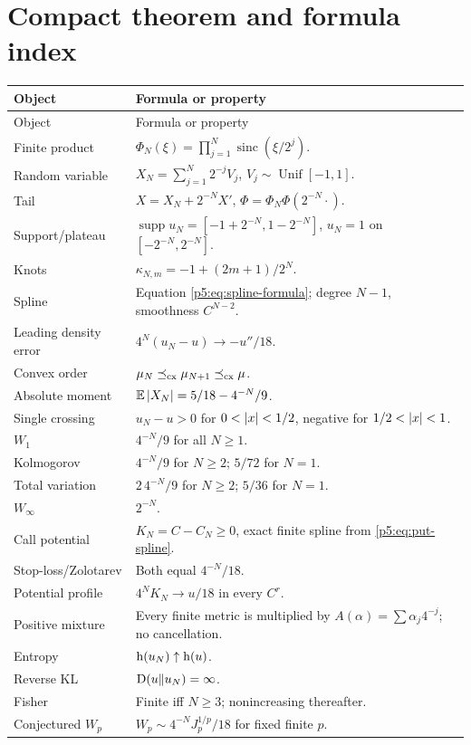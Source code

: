 \documentclass[11pt,oneside]{article}
\numberwithin{equation}{section}
\theoremstyle{definition}
\theoremstyle{remark}
\newcommand{\E}{\mathbb E}
\newcommand{\sinc}{\operatorname{sinc}}
\newcommand{\supp}{\operatorname{supp}}
\begin{document}
\section{Compact theorem and formula index}
\label{p5:sec:index}

\begin{longtable}{@{}p{}p{}@{}}
\toprule
Object & Formula or property\\
\midrule
\endfirsthead
\toprule
Object & Formula or property\\
\midrule
\endhead
Finite product & $\Phi_N(\xi)=\prod_{j=1}^{N}\sinc(\xi/2^j)$.\\
Random variable & $X_N=\sum_{j=1}^{N}2^{-j}V_j$, $V_j\sim\operatorname{Unif}[-1,1]$.\\
Tail & $X=X_N+2^{-N}X'$, $\Phi=\Phi_N\Phi(2^{-N}\cdot)$.\\
Support/plateau & $\supp u_N=[-1+2^{-N},1-2^{-N}]$, $u_N=1$ on $[-2^{-N},2^{-N}]$.\\
Knots & $\kappa_{N,m}=-1+(2m+1)/2^N$.\\
Spline & Equation \eqref{p5:eq:spline-formula}; degree $N-1$, smoothness $C^{N-2}$.\\
Leading density error & $4^N(u_N-u)\to-u''/18$.\\
Convex order & $\mu_N\preceq_{\rm cx}\mu_{N+1}\preceq_{\rm cx}\mu$.\\
Absolute moment & $\E\abs{X_N}=5/18-4^{-N}/9$.\\
Single crossing & $u_N-u>0$ for $0<\left\lvert x\right\rvert<1/2$, negative for $1/2<\left\lvert x\right\rvert<1$.\\
$W_1$ & $4^{-N}/9$ for all $N\ge1$.\\
Kolmogorov & $4^{-N}/9$ for $N\ge2$; $5/72$ for $N=1$.\\
Total variation & $2\,4^{-N}/9$ for $N\ge2$; $5/36$ for $N=1$.\\
$W_\infty$ & $2^{-N}$.\\
Call potential & $K_N=C-C_N\ge0$, exact finite spline from \eqref{p5:eq:put-spline}.\\
Stop-loss/Zolotarev & Both equal $4^{-N}/18$.\\
Potential profile & $4^NK_N\to u/18$ in every $C^r$.\\
Positive mixture & Every finite metric is multiplied by $A(\alpha)=\sum\alpha_j4^{-j}$; no cancellation.\\
Entropy & $\operatorname{h}(u_N)\uparrow\operatorname{h}(u)$.\\
Reverse KL & $\operatorname{D}(u\Vert u_N)=\infty$.\\
Fisher & Finite iff $N\ge3$; nonincreasing thereafter.\\
Conjectured $W_p$ & $W_p\sim4^{-N}J_p^{1/p}/18$ for fixed finite $p$.\\
\bottomrule
\end{longtable}
\end{document}
